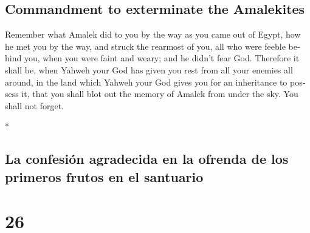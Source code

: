 \begin{paracol}{2}
\begin{otherlanguage}{english}
\hypertarget{commandment-to-exterminate-the-amalekites}{%
\subsection{Commandment to exterminate the
Amalekites}\label{commandment-to-exterminate-the-amalekites}}

 Remember what Amalek did to you by the way as you came
out of Egypt,  how he met you by the way, and struck the
rearmost of you, all who were feeble behind you, when you were faint and
weary; and he didn't fear God.  Therefore it shall be,
when Yahweh your God has given you rest from all your enemies all
around, in the land which Yahweh your God gives you for an inheritance
to possess it, that you shall blot out the memory of Amalek from under
the sky. You shall not forget.

\end{otherlanguage}

\switchcolumn[0]*

\hypertarget{la-confesiuxf3n-agradecida-en-la-ofrenda-de-los-primeros-frutos-en-el-santuario}{%
\subsection{La confesión agradecida en la ofrenda de los primeros frutos
en el
santuario}\label{la-confesiuxf3n-agradecida-en-la-ofrenda-de-los-primeros-frutos-en-el-santuario}}

\hypertarget{section-50}{%
\section{26}\label{section-50}}


\end{paracol}
